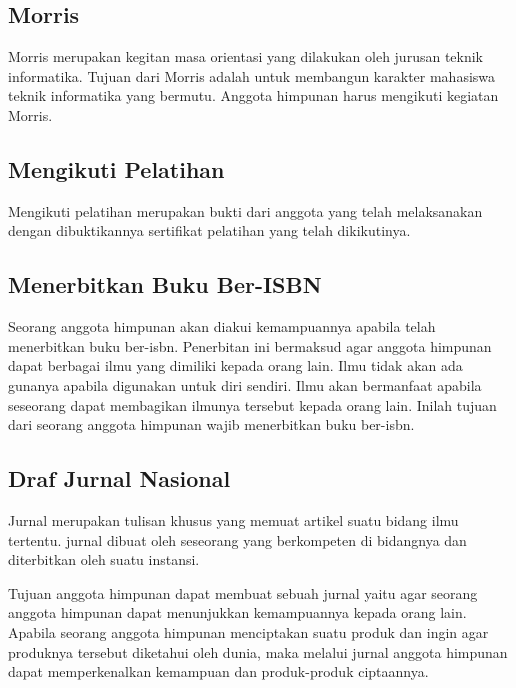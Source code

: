 \subsection{Morris}
\par
Morris merupakan kegitan masa orientasi yang dilakukan oleh jurusan teknik informatika. Tujuan dari Morris adalah untuk membangun karakter mahasiswa teknik informatika yang bermutu. Anggota himpunan harus mengikuti kegiatan Morris.

\subsection{Mengikuti Pelatihan}
\par
Mengikuti pelatihan merupakan bukti dari anggota yang telah melaksanakan dengan dibuktikannya sertifikat pelatihan yang telah dikikutinya.

\subsection{Menerbitkan Buku Ber-ISBN}
\par
Seorang anggota himpunan akan diakui kemampuannya apabila telah menerbitkan buku ber-isbn. Penerbitan ini bermaksud agar anggota himpunan dapat berbagai ilmu yang dimiliki kepada orang lain. Ilmu tidak akan ada gunanya apabila digunakan untuk diri sendiri. Ilmu akan bermanfaat apabila seseorang dapat membagikan ilmunya tersebut kepada orang lain. Inilah tujuan dari seorang anggota himpunan wajib menerbitkan buku ber-isbn.

\subsection{Draf Jurnal Nasional}
\par
Jurnal merupakan tulisan khusus yang memuat artikel suatu bidang ilmu tertentu. jurnal dibuat oleh seseorang yang berkompeten di bidangnya dan diterbitkan oleh suatu instansi.\\
\par
Tujuan anggota himpunan dapat membuat sebuah jurnal yaitu agar seorang anggota himpunan dapat menunjukkan kemampuannya kepada orang lain. Apabila seorang anggota himpunan menciptakan suatu produk dan ingin agar produknya tersebut diketahui oleh dunia, maka melalui jurnal anggota himpunan dapat memperkenalkan kemampuan dan produk-produk ciptaannya.

